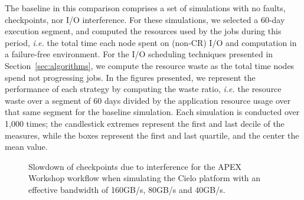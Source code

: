 \documentclass[conference,nofonttune]{IEEEtran}
\newcommand{\ie}[0]{\emph{i.e.}\xspace}
\begin{document}
\begin{table}
\centering
{}
\caption{LANL Workflow Workload from the APEX Workflows report.\label{table:lanl}}
\end{table}

The baseline in this comparison comprises a set of simulations with no faults,
checkpoints, nor I/O interference. For these simulations, we selected a 60-day
execution segment, and computed the resources used by the jobs during this
period, \ie the total time each node spent on (non-CR) I/O and computation in a
failure-free environment.
For the I/O scheduling techniques presented in Section~\ref{sec:algorithms}, we
compute the resource waste as the total time nodes spend not progressing jobs.
In the figures presented, we represent the performance of each strategy by
computing the waste ratio, \ie the resource waste over a segment of 60 days
divided by the application resource usage over that same segment for the
baseline simulation. Each simulation is conducted over 1,000 times; the
candlestick extremes represent the first and last decile of the measures, while
the boxes represent the first and last quartile, and the center the mean value.

\begin{figure}[t]
  \begin{center}
    \resizebox{1.05\linewidth}{!}{}
 \end{center}
    \caption{\label{fig:ckps-slow}Slowdown of checkpoints due to
      interference for the APEX Workshop workflow when simulating the
      Cielo platform with an effective bandwidth of 160GB/s, 80GB/s
      and 40GB/s.}
 \end{figure}
\end{document}
